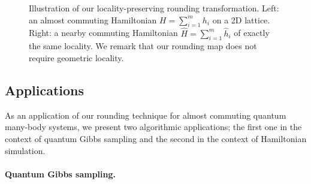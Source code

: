 \documentclass[11pt]{article}
\theoremstyle{plain}
\begin{document}
\begin{figure}[t]
\caption{Illustration of our locality-preserving rounding transformation. 
Left: an almost commuting Hamiltonian $H=\sum_{i=1}^m h_i$ on a 2D lattice. 
Right: a nearby commuting Hamiltonian $\hat{H}=\sum_{i=1}^m \hat{h}_i$ of exactly the same locality. We remark that our rounding map does not require geometric locality.}
\end{figure}




\subsection{Applications}

As an application of our rounding technique for almost commuting quantum many-body systems, we present two algorithmic applications; the first one in the context of quantum Gibbs sampling and the second in the context of Hamiltonian simulation.

\paragraph{Quantum Gibbs sampling.}
\end{document}
